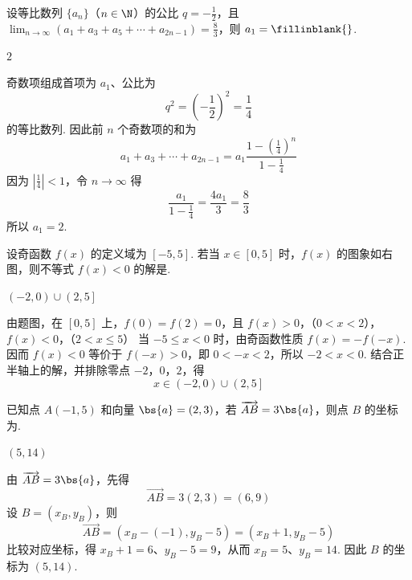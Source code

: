 \begin{problem}
设等比数列 \(\{a_n\}\)（\(n \in \N\)）的公比 \(q = -\frac{1}{2}\)，且 \(\displaystyle\lim_{n\to\infty}\left(a_1 + a_3 + a_5 + \cdots + a_{2n-1}\right) = \frac{8}{3}\)，则 \(a_1 =\fillinblank{}\).
\end{problem}

\begin{answer}
\(2\)
\end{answer}

\begin{solution}
奇数项组成首项为 \(a_{1}\)、公比为
\[
q^2=\left(-\frac{1}{2}\right)^2=\frac{1}{4}
\]
的等比数列. 因此前 \(n\) 个奇数项的和为
\[
a_{1}+a_{3}+\cdots+a_{2n-1}
=a_{1}\frac{1-(\frac14)^n}{1-\frac14}
\]因为 \(\left|\frac14\right|<1\)，令 \(n\to\infty\) 得
\[
\frac{a_{1}}{1-\frac14}=\frac{4a_{1}}{3}=\frac{8}{3}
\]所以 \(a_{1}=2\).
\end{solution}

\begin{problem}
设奇函数 \(f(x)\) 的定义域为 \([-5, 5]\). 若当 \(x \in [0, 5]\) 时，\(f(x)\) 的图象如右图，则不等式 \(f(x) < 0\) 的解是\fillinblank{}.

\end{problem}

\begin{answer}
\(\left(-2,0\right)\cup\left(2,5\right]\)
\end{answer}

\begin{solution}
由题图，在 \([0,5]\) 上，\(f(0)=f(2)=0\)，且
\(f(x)>0\)，（\(0<x<2\)），\(f(x)<0\)，（\(2<x\leqslant5\)）
当 \(-5\leqslant x<0\) 时，由奇函数性质 \(f(x)=-f(-x)\). 因而 \(f(x)<0\) 等价于 \(f(-x)>0\)，即 \(0<-x<2\)，所以 \(-2<x<0\). 结合正半轴上的解，并排除零点 \(-2\)，\(0\)，\(2\)，得
\[
x\in\left(-2,0\right)\cup\left(2,5\right]
\]
\end{solution}

\begin{problem}
已知点 \(A\left(-1,5\right)\) 和向量 \(\bs{a} = \left(2,3\right)\)，若 \(\overrightarrow{AB} = 3\bs{a}\)，则点 \(B\) 的坐标为\fillinblank{}.
\end{problem}

\begin{answer}
\(\left(5,14\right)\)
\end{answer}

\begin{solution}
由 \(\overrightarrow{AB}=3\bs{a}\)，先得
\[
\overrightarrow{AB}=3(2,3)=(6,9)
\]设 \(B=(x_B,y_B)\)，则
\[
\overrightarrow{AB}=(x_B-(-1),y_B-5)=(x_B+1,y_B-5)
\]比较对应坐标，得 \(x_B+1=6\)、\(y_B-5=9\)，从而 \(x_B=5\)、\(y_B=14\). 因此 \(B\) 的坐标为 \(\left(5,14\right)\).
\end{solution}


